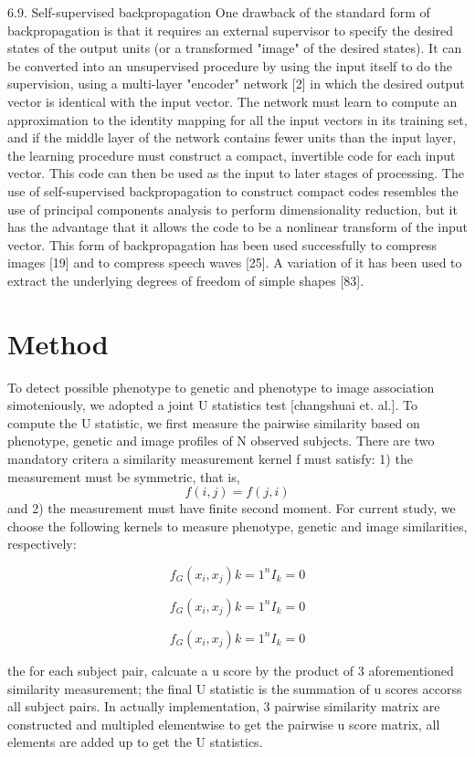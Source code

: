 \documentclass{article}
\begin{document}
6.9. Self-supervised backpropagation
One drawback of the standard form of backpropagation is that it requires an external supervisor to specify the desired states of the output units (or a transformed "image" of the desired states). It can be converted into an unsupervised procedure by using the input itself to do the supervision, using a multi-layer "encoder" network [2] in which the desired output vector is identical with the input vector. The network must learn to compute an approximation to the identity mapping for all the input vectors in its training set, and if the middle layer of the network contains fewer units than the input
layer, the learning procedure must construct a compact, invertible code for each input vector. This code can then be used as the input to later stages of processing.
The use of self-supervised backpropagation to construct compact codes resembles the use of principal components analysis to perform dimensionality reduction, but it has the advantage that it allows the code to be a nonlinear transform of the input vector. This form of backpropagation has been used successfully to compress images [19] and to compress speech waves [25]. A variation of it has been used to extract the underlying degrees of freedom of simple shapes [83].

\section{Method}
To detect possible phenotype to genetic and phenotype to image association simoteniously, we adopted a joint U statistics test [changshuai et. al.].
To compute the U statistic, we first measure the pairwise similarity based on phenotype, genetic and image profiles of N observed subjects. There are two mandatory critera a similarity measurement kernel f must satisfy: 1) the measurement must be symmetric, that is, \begin{equation}f(i,j)=f(j,i)\end{equation} and 2) the measurement must have finite second moment. For current study, we choose the following kernels to measure phenotype, genetic and image similarities, respectively:

\begin{equation}
f_G(x_i,x_j){k=1}^{n} I_k = 0
\end{equation}

\begin{equation}
f_G(x_i,x_j){k=1}^{n} I_k = 0
\end{equation}

\begin{equation}
f_G(x_i,x_j){k=1}^{n} I_k = 0
\end{equation}

 the for each subject pair, calcuate a u score by the product of 3 aforementioned similarity measurement; the final U statistic is the summation of u scores accorss all subject pairs. In actually implementation, 3 pairwise similarity matrix are constructed and multipled elementwise to get the pairwise u score matrix, all elements are added up to get the U statistics.
\end{document}

